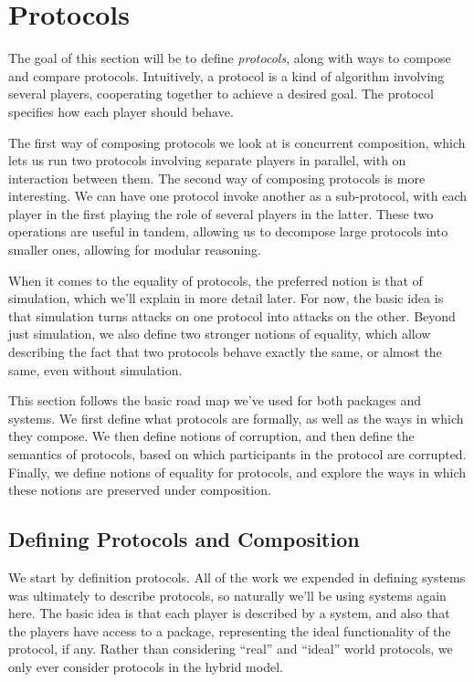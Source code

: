 \section{Protocols}

The goal of this section will be to define \emph{protocols},
along with ways to compose and compare protocols.
Intuitively, a protocol is a kind of algorithm involving several
players, cooperating together to achieve a desired goal.
The protocol specifies how each player should behave.

The first way of composing protocols we look at is concurrent composition,
which lets us run two protocols involving separate players in parallel,
with on interaction between them.
The second way of composing protocols is more interesting.
We can have one protocol invoke another as a sub-protocol,
with each player in the first playing the role of several players
in the latter.
These two operations are useful in tandem, allowing
us to decompose large protocols into smaller ones,
allowing for modular reasoning.

When it comes to the equality of protocols,
the preferred notion is that of simulation,
which we'll explain in more detail later.
For now, the basic idea is that simulation
turns attacks on one protocol into attacks on the other.
Beyond just simulation, we also define two stronger
notions of equality,
which allow describing the fact that two protocols behave exactly the same,
or almost the same, even without simulation.

This section follows the basic road map we've used for both packages
and systems.
We first define what protocols are formally, as well as the ways
in which they compose.
We then define notions of corruption, and then define the semantics
of protocols, based on which participants in the protocol
are corrupted.
Finally, we define notions of equality for protocols,
and explore the ways in which these notions are preserved under composition.

\subsection{Defining Protocols and Composition}

We start by definition protocols.
All of the work we expended in defining systems was ultimately
to describe protocols,
so naturally we'll be using systems again here.
The basic idea is that each player is described by a system,
and also that the players have access to a package,
representing the ideal functionality of the protocol,
if any.
Rather than considering ``real'' and ``ideal'' world protocols,
we only ever consider protocols in the hybrid model.

